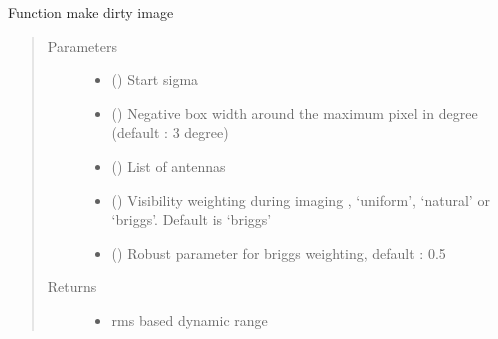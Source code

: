 \documentclass[letterpaper,10pt,english]{sphinxmanual}
\begin{document}
\begin{fulllineitems}
\begin{fulllineitems}
\label{\detokenize{paircars:paircars.intensity_selfcal_LTS.IntensitySelfcal.dirty_image}}
\sphinxAtStartPar
Function make dirty image
\begin{quote}\begin{description}
\item[{Parameters}] \leavevmode\begin{itemize}
\item {} 
\sphinxAtStartPar
{} () \textendash{} Start sigma

\item {} 
\sphinxAtStartPar
{} () \textendash{} Negative box width around the maximum pixel in degree (default : 3 degree)

\item {} 
\sphinxAtStartPar
{} () \textendash{} List of antennas

\item {} 
\sphinxAtStartPar
{} () \textendash{} Visibility weighting during imaging , ‘uniform’, ‘natural’ or ‘briggs’. Default is ‘briggs’

\item {} 
\sphinxAtStartPar
{} () \textendash{} Robust parameter for briggs weighting, default : 0.5

\end{itemize}

\item[{Returns}] \leavevmode
\sphinxAtStartPar
\begin{itemize}
\item {} 
\sphinxAtStartPar
{} \textendash{} rms based dynamic range


\end{itemize}
\end{description}
\end{quote}
\end{fulllineitems}
\end{fulllineitems}
\end{document}
